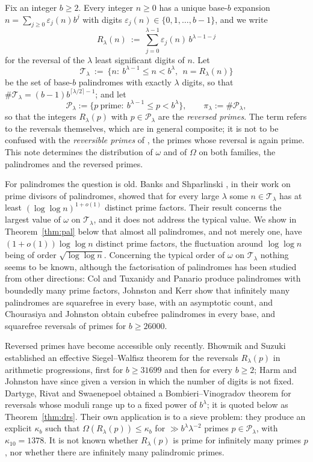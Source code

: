 \documentclass[11pt,a4paper]{article}
\theoremstyle{plain}
\theoremstyle{definition}
\newcommand{\eps}{\varepsilon}
\numberwithin{equation}{section}
\begin{document}
Fix an integer $b\ge2$. Every integer $n\ge0$ has a unique base-$b$ expansion
$n=\sum_{j\ge0}\eps_j(n)b^{j}$ with digits $\eps_j(n)\in\{0,1,\dots,b-1\}$, and we write
\begin{equation}\label{eq:defR}
R_\lambda(n)\ :=\ \sum_{j=0}^{\lambda-1}\eps_j(n)\,b^{\lambda-1-j}
\end{equation}
for the reversal of the $\lambda$ least significant digits of $n$. Let
\[
\mathcal T_\lambda\ :=\ \bigl\{n:\ b^{\lambda-1}\le n<b^{\lambda},\ \ n=R_\lambda(n)\bigr\}
\]
be the set of base-$b$ palindromes with exactly $\lambda$ digits, so that
$\#\mathcal T_\lambda=(b-1)b^{\lceil\lambda/2\rceil-1}$; and let
\[
\mathcal P_\lambda:=\bigl\{p\ \text{prime}:\ b^{\lambda-1}\le p<b^{\lambda}\bigr\},\qquad
\pi_\lambda:=\#\mathcal P_\lambda,
\]
so that the integers $R_\lambda(p)$ with $p\in\mathcal P_\lambda$ are the \emph{reversed primes}. The
term refers to the reversals themselves, which are in general composite; it is not to be confused with
the \emph{reversible primes} of \cite{DMRSS}, the primes whose reversal is again prime. This note
determines the distribution of $\omega$ and of $\Omega$ on both families, the palindromes and the
reversed primes.

For palindromes the question is old. Banks and Shparlinski \cite{BSh}, in their work on prime divisors
of palindromes, showed that for every large $\lambda$ some $n\in\mathcal T_\lambda$ has at least
$(\log\log n)^{1+o(1)}$ distinct prime factors. Their result concerns the largest value of $\omega$ on
$\mathcal T_\lambda$, and it does not address the typical value. We show in Theorem~\ref{thm:pal} below
that almost all palindromes, and not merely one, have $(1+o(1))\log\log n$ distinct prime factors, the
fluctuation around $\log\log n$ being of order $\sqrt{\log\log n}$. Concerning the typical order of
$\omega$ on $\mathcal T_\lambda$ nothing seems to be known, although the factorisation of palindromes
has been studied from other directions: Col \cite{Col} and Tuxanidy and Panario \cite{TP} produce palindromes
with boundedly many prime factors, Johnston and Kerr \cite{JK} show that infinitely many palindromes are
squarefree in every base, with an asymptotic count, and Chourasiya and Johnston \cite{CJ} obtain
cubefree palindromes in every base, and squarefree reversals of primes for $b\ge26000$.

Reversed primes have become accessible only recently. Bhowmik and
Suzuki \cite{BS1,BS2} established an effective Siegel--Walfisz theorem for the reversals $R_\lambda(p)$ in
arithmetic progressions, first for $b\ge31699$ and then for every $b\ge2$; Harm and Johnston \cite{HJ}
have since given a version in which the number of digits is not fixed. Dartyge, Rivat and
Swaenepoel \cite{DRS} obtained a Bombieri--Vinogradov theorem for reversals whose moduli range up to a
fixed power of $b^{\lambda}$; it is quoted below as Theorem~\ref{thm:drs}. Their own application is to a
sieve problem: they produce an explicit $\kappa_b$ such that $\Omega(R_\lambda(p))\le\kappa_b$ for
$\gg b^{\lambda}\lambda^{-2}$ primes $p\in\mathcal P_\lambda$, with $\kappa_{10}=1378$. It is not known
whether $R_\lambda(p)$ is prime for infinitely many primes $p$, nor whether there are infinitely many
palindromic primes.
\end{document}
